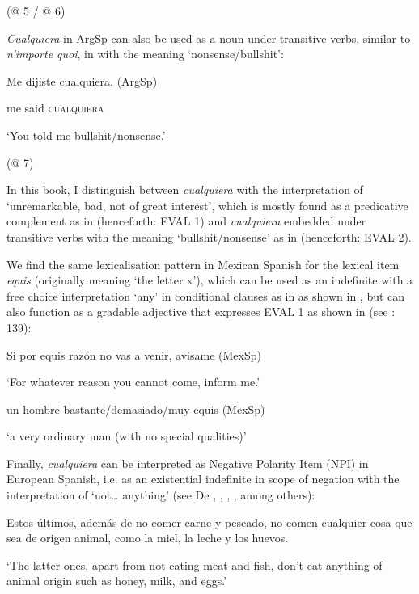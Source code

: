 \documentclass[output=paper]{langscibook}
\begin{document}
    (@ 5 / @ 6)

\textit{Cualquiera} in ArgSp can also be used as a noun under transitive verbs, similar to \textit{n’importe quoi}, in  with the meaning ‘nonsense/bullshit’:

    Me  dijiste  cualquiera.  (ArgSp)

    me  said  \textsc{cualquiera}   

    ‘You told me bullshit/nonsense.’

    (@ 7)

In this book, I distinguish between \textit{cualquiera} with the interpretation of ‘unremarkable, bad, not of great interest’, which is mostly found as a predicative complement as in  (henceforth: EVAL 1) and \textit{cualquiera} embedded under transitive verbs with the meaning ‘bullshit/nonsense’ as in  (henceforth: EVAL 2).

  We find the same lexicalisation pattern in Mexican Spanish for the lexical item \textit{equis} (originally meaning ‘the letter x’), which can be used as an indefinite with a free choice interpretation ‘any’ in conditional clauses as in  as shown in \citet[137]{Kellert2020a}, but can also function as a gradable adjective that expresses EVAL 1 as shown in  (see \citealt{Kellert2020a}: 139):

    Si por equis razón no vas a venir, avisame  (MexSp)

    ‘For whatever reason you cannot come, inform me.’  

    \citep[137]{Kellert2020a}

    un hombre bastante/demasiado/muy equis  (MexSp)

    ‘a very ordinary man (with no special qualities)’  

    \citep[138]{Kellert2020a}

Finally, \textit{cualquiera} can be interpreted as Negative Polarity Item (NPI) in European Spanish, i.e. as an existential indefinite in scope of negation with the interpretation of ‘not… anything’ (see De \citealt{Bruyne2011}, , \citealt{Arregui2006}, \citealt{Chierchia2006}, among others):

    Estos últimos, además de no comer carne y pescado, no comen cualquier cosa que sea de origen animal, como la miel, la leche y los huevos.

    ‘The latter ones, apart from not eating meat and fish, don’t eat anything of animal origin such as honey, milk, and eggs.’
\end{document}
